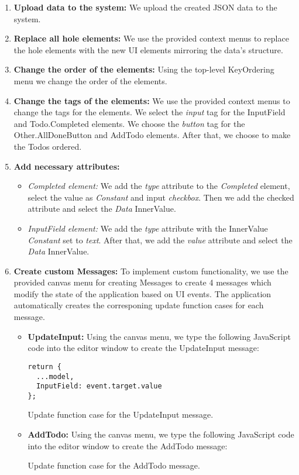 \begin{enumerate}
\item \textbf{Upload data to the system:} We upload the created JSON data to the system.
\item \textbf{Replace all hole elements:} We use the provided context menus to replace the hole elements with the new UI elements mirroring the data's structure.
\item \textbf{Change the order of the elements:} Using the top-level KeyOrdering menu we change the order of the elements.
\item \textbf{Change the tags of the elements:} We use the provided context menus to change the tags for the elements.
We select the \emph{input} tag for the InputField and Todo.Completed elements. We choose the \emph{button} tag for the Other.AllDoneButton and AddTodo elements.
After that, we choose to make the Todos ordered.
\item \textbf{Add necessary attributes:}
\begin{itemize}
	\item \emph{Completed element:} We add the \emph{type} attribute to the \emph{Completed} element, select the value as \emph{Constant} and input \emph{checkbox}.
	      Then we add the checked attribute and select the \emph{Data} InnerValue.
	\item \emph{InputField element:} We add the \emph{type} attribute with the InnerValue \emph{Constant} set to \emph{text}.
	      After that, we add the \emph{value} attribute and select the \emph{Data} InnerValue.
\end{itemize}
\item \textbf{Create custom Messages:} To implement custom functionality, we use the provided canvas menu for creating Messages to create 4 messages which modify the state of the application based on UI events. The application automatically creates the corresponing update function cases for each message.
\begin{itemize}
\item \textbf{UpdateInput:}  Using the canvas menu, we type the following JavaScript code into the editor window to create the UpdateInput message:
\begin{listing}[!htbp]
\begin{lstlisting}
return {
  ...model,
  InputField: event.target.value
};
            \end{lstlisting}
\caption{Update function case for the UpdateInput message.}
\end {listing}
\item \textbf{AddTodo:} Using the canvas menu, we type the following JavaScript code into the editor window to create the AddTodo message:
\begin{listing}[!htbp]
	\caption{Update function case for the AddTodo message.}


\end{listing}
\end{itemize}
\end{enumerate}

